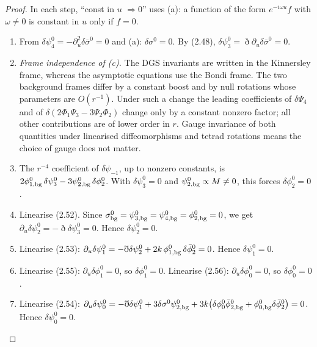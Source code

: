 \documentclass[11pt]{article}
\begin{document}
\begin{proof}
In each step, ``const in $u$ $\Rightarrow 0$'' uses (a): a function of the form $e^{-i\omega u}f$ with $\omega\neq0$ is constant in $u$ only if $f=0$.
\begin{enumerate}
\item From $\delta\psi_4^0=-\partial_u^2\delta\bar\sigma^0=0$ and (a): $\delta\sigma^0=0$. By (2.48), $\delta\psi_3^0=\eth\partial_u\delta\bar\sigma^0=0$.

\item \emph{Frame independence of (c).} The DGS invariants are written in the Kinnersley frame, whereas the asymptotic equations use the Bondi frame. The two background frames differ by a constant boost and by null rotations whose parameters are $O(r^{-1})$. Under such a change the leading coefficients of $\delta\Psi_4$ and of $\delta(2\Phi_1\Psi_3-3\Psi_2\Phi_2)$ change only by a constant nonzero factor; all other contributions are of lower order in $r$. Gauge invariance of both quantities under linearised diffeomorphisms and tetrad rotations means the choice of gauge does not matter.

\item The $r^{-4}$ coefficient of $\delta\psi_{-1}$, up to nonzero constants, is $2\phi^0_{1,\rm bg}\,\delta\psi_3^0-3\psi^0_{2,\rm bg}\,\delta\phi_2^0$. With $\delta\psi_3^0=0$ and $\psi^0_{2,\rm bg}\propto M\neq0$, this forces $\delta\phi_2^0=0$.

\item Linearise (2.52). Since $\sigma^0_{\rm bg}=\psi^0_{3,\rm bg}=\psi^0_{4,\rm bg}=\phi^0_{2,\rm bg}=0$, we get $\partial_u\delta\psi_2^0=-\eth\delta\psi_3^0=0$. Hence $\delta\psi_2^0=0$.

\item Linearise (2.53): $\partial_u\delta\psi_1^0=-\eth\delta\psi_2^0+2k\,\phi^0_{1,\rm bg}\,\delta\bar\phi_2^0=0$. Hence $\delta\psi_1^0=0$.

\item Linearise (2.55): $\partial_u\delta\phi_1^0=0$, so $\delta\phi_1^0=0$. Linearise (2.56): $\partial_u\delta\phi_0^0=0$, so $\delta\phi_0^0=0$.

\item Linearise (2.54): $\partial_u\delta\psi_0^0=-\eth\delta\psi_1^0+3\delta\sigma^0\psi^0_{2,\rm bg}+3k\big(\delta\phi_0^0\bar\phi^0_{2,\rm bg}+\phi^0_{0,\rm bg}\delta\bar\phi_2^0\big)=0$. Hence $\delta\psi_0^0=0$. \qedhere
\end{enumerate}
\end{proof}
\end{document}
